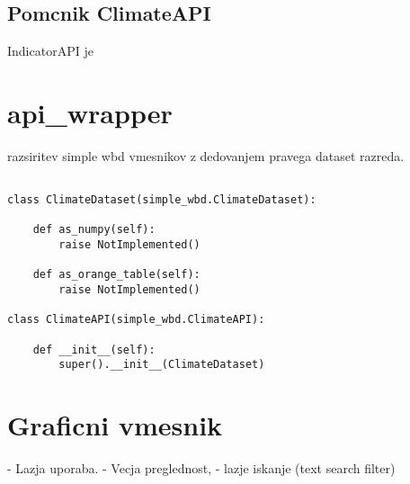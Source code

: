 \subsection{Pomcnik ClimateAPI}

IndicatorAPI je 



% 
% 



\section{api\_wrapper}



razsiritev simple wbd vmesnikov z dedovanjem pravega dataset razreda.

\begin{verbatim}

class ClimateDataset(simple_wbd.ClimateDataset):
    
    def as_numpy(self):
        raise NotImplemented()
    
    def as_orange_table(self):
        raise NotImplemented()

class ClimateAPI(simple_wbd.ClimateAPI):

    def __init__(self):
        super().__init__(ClimateDataset)
\end{verbatim}





\section{Graficni vmesnik}


- Lazja uporaba.
- Vecja preglednost,
- lazje iskanje (text search filter)
